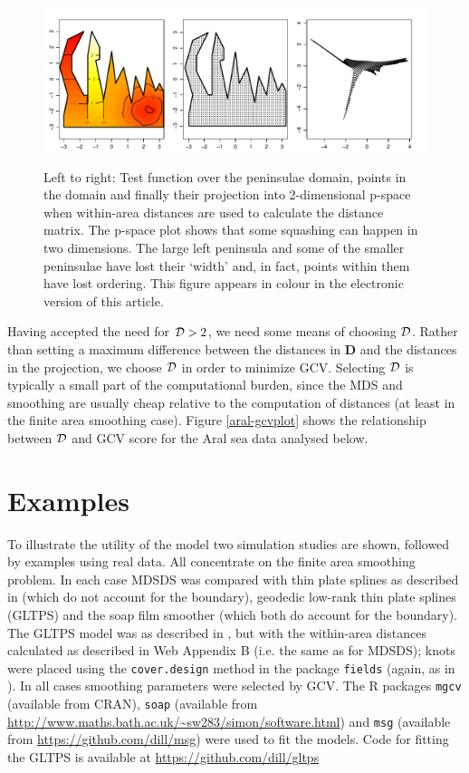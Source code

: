\documentclass[smallextended]{svjour3}       %
\begin{document}
\begin{figure}
\centering
\includegraphics[width=\textwidth]{examples/wt2/wt2-plot.pdf} \\
\caption{Left to right: Test function over the peninsulae domain, points in the domain and finally their projection into 2-dimensional p-space when within-area distances are used to calculate the distance matrix. The p-space plot shows that some squashing can happen in two dimensions. The large left peninsula and some of the smaller peninsulae have lost their `width' and, in fact, points within them have lost ordering. This figure appears in colour in the electronic version of this article.}
\label{wt2-plot}
\end{figure}

Having accepted the need for ${\cal D}>2$, we need some means of choosing $\cal D$. Rather than setting a maximum difference between the distances in $\mathbf{D}$ and the distances in the projection, we choose $\cal D$ in order to minimize GCV. Selecting $\cal D$ is typically a small part of the computational burden, since the MDS and smoothing are usually cheap relative to the computation of distances (at least in the finite area smoothing case). Figure \ref{aral-gcvplot} shows the relationship between $\cal D$ and GCV score for the Aral sea data analysed below. 


\section{Examples}
\label{examples}

To illustrate the utility of the model two simulation studies are shown, followed by examples using real data. All concentrate on the finite area smoothing problem. In each case MDSDS was compared with thin plate splines as described in \cite{Wood:2003tc} (which do not account for the boundary), geodedic low-rank thin plate splines (GLTPS) and the soap film smoother (which both do account for the boundary). The GLTPS model was as described in \cite{Wang:2007tf}, but with the within-area distances calculated as described in Web Appendix B (i.e. the same as for MDSDS); knots were placed using the \texttt{cover.design} method in the package \texttt{fields} (again, as in \cite{Wang:2007tf}). In all cases smoothing parameters were selected by GCV. The \textsf{R} packages \texttt{mgcv} (available from CRAN), \texttt{soap} (available from \url{http://www.maths.bath.ac.uk/~sw283/simon/software.html}) and \texttt{msg} (available from \url{https://github.com/dill/msg}) were used to fit the models. Code for fitting the GLTPS is available at \url{https://github.com/dill/gltps}
\end{document}
